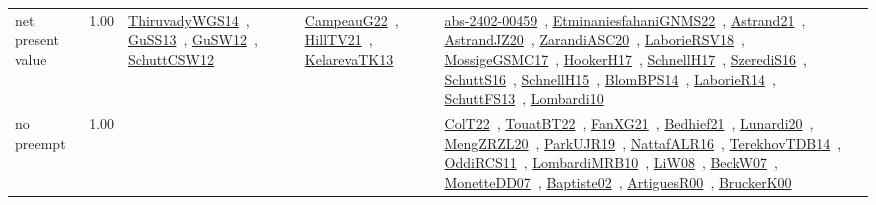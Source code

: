{\begin{longtable}{p{3cm}r>{\raggedright\arraybackslash}p{6cm}>{\raggedright\arraybackslash}p{6cm}>{\raggedright\arraybackslash}p{8cm}}
\index{net present value}\index{Concepts!net present value}net present value &  1.00 & \href{../works/ThiruvadyWGS14.pdf}{ThiruvadyWGS14}~\cite{ThiruvadyWGS14}, \href{../works/GuSS13.pdf}{GuSS13}~\cite{GuSS13}, \href{../works/GuSW12.pdf}{GuSW12}~\cite{GuSW12}, \href{../works/SchuttCSW12.pdf}{SchuttCSW12}~\cite{SchuttCSW12} & \href{../works/CampeauG22.pdf}{CampeauG22}~\cite{CampeauG22}, \href{../works/HillTV21.pdf}{HillTV21}~\cite{HillTV21}, \href{../works/KelarevaTK13.pdf}{KelarevaTK13}~\cite{KelarevaTK13} & \href{../works/abs-2402-00459.pdf}{abs-2402-00459}~\cite{abs-2402-00459}, \href{../works/EtminaniesfahaniGNMS22.pdf}{EtminaniesfahaniGNMS22}~\cite{EtminaniesfahaniGNMS22}, \href{../works/Astrand21.pdf}{Astrand21}~\cite{Astrand21}, \href{../works/AstrandJZ20.pdf}{AstrandJZ20}~\cite{AstrandJZ20}, \href{../works/ZarandiASC20.pdf}{ZarandiASC20}~\cite{ZarandiASC20}, \href{../works/LaborieRSV18.pdf}{LaborieRSV18}~\cite{LaborieRSV18}, \href{../works/MossigeGSMC17.pdf}{MossigeGSMC17}~\cite{MossigeGSMC17}, \href{../works/HookerH17.pdf}{HookerH17}~\cite{HookerH17}, \href{../works/SchnellH17.pdf}{SchnellH17}~\cite{SchnellH17}, \href{../works/SzerediS16.pdf}{SzerediS16}~\cite{SzerediS16}, \href{../works/SchuttS16.pdf}{SchuttS16}~\cite{SchuttS16}, \href{../works/SchnellH15.pdf}{SchnellH15}~\cite{SchnellH15}, \href{../works/BlomBPS14.pdf}{BlomBPS14}~\cite{BlomBPS14}, \href{../works/LaborieR14.pdf}{LaborieR14}~\cite{LaborieR14}, \href{../works/SchuttFS13.pdf}{SchuttFS13}~\cite{SchuttFS13}, \href{../works/Lombardi10.pdf}{Lombardi10}~\cite{Lombardi10}\\
\index{no preempt}\index{Concepts!no preempt}no preempt &  1.00 &  &  & \href{../works/ColT22.pdf}{ColT22}~\cite{ColT22}, \href{../works/TouatBT22.pdf}{TouatBT22}~\cite{TouatBT22}, \href{../works/FanXG21.pdf}{FanXG21}~\cite{FanXG21}, \href{../works/Bedhief21.pdf}{Bedhief21}~\cite{Bedhief21}, \href{../works/Lunardi20.pdf}{Lunardi20}~\cite{Lunardi20}, \href{../works/MengZRZL20.pdf}{MengZRZL20}~\cite{MengZRZL20}, \href{../works/ParkUJR19.pdf}{ParkUJR19}~\cite{ParkUJR19}, \href{../works/NattafALR16.pdf}{NattafALR16}~\cite{NattafALR16}, \href{../works/TerekhovTDB14.pdf}{TerekhovTDB14}~\cite{TerekhovTDB14}, \href{../works/OddiRCS11.pdf}{OddiRCS11}~\cite{OddiRCS11}, \href{../works/LombardiMRB10.pdf}{LombardiMRB10}~\cite{LombardiMRB10}, \href{../works/LiW08.pdf}{LiW08}~\cite{LiW08}, \href{../works/BeckW07.pdf}{BeckW07}~\cite{BeckW07}, \href{../works/MonetteDD07.pdf}{MonetteDD07}~\cite{MonetteDD07}, \href{../works/Baptiste02.pdf}{Baptiste02}~\cite{Baptiste02}, \href{../works/ArtiguesR00.pdf}{ArtiguesR00}~\cite{ArtiguesR00}, \href{../works/BruckerK00.pdf}{BruckerK00}~\cite{BruckerK00}\\

\end{longtable}}
